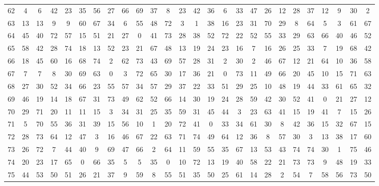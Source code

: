 \begin{table}
\begin{tabular}{c c c c c c c c c c c c c c c c c c c c c c c c c c }
62 & 4 & 6 & 42 & 23 & 35 & 56 & 27 & 66 & 69 & 37 & 8 & 23 & 42 & 36 & 6 & 33 & 47 & 26 & 12 & 28 & 37 & 12 & 9 & 30 & 2 \\
63 & 13 & 13 & 9 & 9 & 60 & 67 & 34 & 6 & 55 & 48 & 72 & 3 & 1 & 38 & 16 & 23 & 31 & 70 & 29 & 8 & 64 & 5 & 3 & 61 & 67 \\
64 & 45 & 40 & 72 & 57 & 15 & 51 & 21 & 27 & 0 & 41 & 73 & 28 & 38 & 52 & 72 & 22 & 52 & 55 & 33 & 29 & 63 & 66 & 40 & 46 & 52 \\
65 & 58 & 42 & 28 & 74 & 18 & 13 & 52 & 23 & 21 & 67 & 48 & 13 & 19 & 24 & 23 & 16 & 7 & 16 & 26 & 25 & 33 & 7 & 19 & 68 & 42 \\
66 & 18 & 45 & 60 & 16 & 68 & 74 & 2 & 62 & 73 & 43 & 69 & 57 & 28 & 31 & 2 & 30 & 2 & 46 & 67 & 12 & 21 & 64 & 10 & 36 & 58 \\
67 & 7 & 7 & 8 & 30 & 69 & 63 & 0 & 3 & 72 & 65 & 30 & 17 & 36 & 21 & 0 & 73 & 11 & 49 & 66 & 20 & 45 & 10 & 15 & 71 & 63 \\
68 & 27 & 30 & 52 & 34 & 66 & 23 & 55 & 57 & 34 & 57 & 29 & 37 & 22 & 33 & 51 & 29 & 25 & 10 & 48 & 19 & 44 & 33 & 61 & 65 & 32 \\
69 & 46 & 19 & 14 & 18 & 67 & 31 & 73 & 49 & 62 & 52 & 66 & 14 & 30 & 19 & 24 & 28 & 59 & 42 & 30 & 52 & 41 & 0 & 21 & 27 & 12 \\
70 & 29 & 71 & 20 & 11 & 11 & 15 & 3 & 34 & 31 & 25 & 35 & 59 & 31 & 45 & 44 & 3 & 23 & 63 & 41 & 15 & 19 & 41 & 7 & 15 & 26 \\
71 & 5 & 70 & 55 & 36 & 31 & 39 & 15 & 56 & 10 & 1 & 20 & 72 & 41 & 0 & 33 & 34 & 61 & 30 & 8 & 42 & 36 & 15 & 32 & 67 & 15 \\
72 & 28 & 73 & 64 & 12 & 47 & 3 & 16 & 46 & 67 & 22 & 63 & 71 & 74 & 49 & 64 & 12 & 36 & 8 & 57 & 30 & 3 & 13 & 38 & 17 & 60 \\
73 & 26 & 72 & 7 & 44 & 40 & 9 & 69 & 47 & 66 & 2 & 64 & 11 & 59 & 55 & 35 & 67 & 13 & 53 & 43 & 74 & 74 & 30 & 1 & 75 & 46 \\
74 & 20 & 23 & 17 & 65 & 0 & 66 & 35 & 5 & 5 & 35 & 0 & 10 & 72 & 13 & 19 & 40 & 58 & 22 & 21 & 73 & 73 & 9 & 48 & 19 & 33 \\
75 & 44 & 53 & 50 & 51 & 26 & 21 & 37 & 9 & 59 & 8 & 55 & 51 & 35 & 50 & 25 & 61 & 14 & 28 & 2 & 54 & 7 & 58 & 56 & 73 & 50 \\
\hline
\end{tabular}
\end{table}